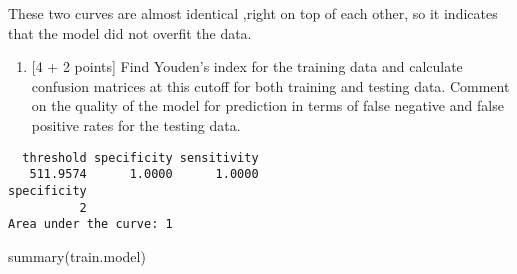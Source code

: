\documentclass[
]{article}
\newenvironment{Shaded}{\begin{snugshade}}{\end{snugshade}}
\newcommand{\AttributeTok}[1]{\textcolor[rgb]{0.77,0.63,0.00}{#1}}
\newcommand{\CommentTok}[1]{\textcolor[rgb]{0.56,0.35,0.01}{\textit{#1}}}
\newcommand{\ConstantTok}[1]{\textcolor[rgb]{0.00,0.00,0.00}{#1}}
\newcommand{\DecValTok}[1]{\textcolor[rgb]{0.00,0.00,0.81}{#1}}
\newcommand{\FunctionTok}[1]{\textcolor[rgb]{0.00,0.00,0.00}{#1}}
\newcommand{\NormalTok}[1]{#1}
\newcommand{\OtherTok}[1]{\textcolor[rgb]{0.56,0.35,0.01}{#1}}
\newcommand{\SpecialCharTok}[1]{\textcolor[rgb]{0.00,0.00,0.00}{#1}}
\newcommand{\StringTok}[1]{\textcolor[rgb]{0.31,0.60,0.02}{#1}}
\providecommand{\tightlist}{%
  \setlength{\itemsep}{0pt}\setlength{\parskip}{0pt}}
\begin{document}
These two curves are almost identical ,right on top of each other, so it
indicates that the model did not overfit the data.

\begin{enumerate}
\def\labelenumi{\alph{enumi}.}
\setcounter{enumi}{5}
\tightlist
\item
  {[}4 + 2 points{]} Find Youden's index for the training data and
  calculate confusion matrices at this cutoff for both training and
  testing data. Comment on the quality of the model for prediction in
  terms of false negative and false positive rates for the testing data.
\end{enumerate}

\begin{Shaded}
\end{Shaded}

\begin{verbatim}
  threshold specificity sensitivity 
   511.9574      1.0000      1.0000 
specificity 
          2 
Area under the curve: 1
\end{verbatim}

\begin{Shaded}
\begin{Highlighting}[]
\FunctionTok{summary}\NormalTok{(train.model)}
\end{Highlighting}
\end{Shaded}
\end{document}
